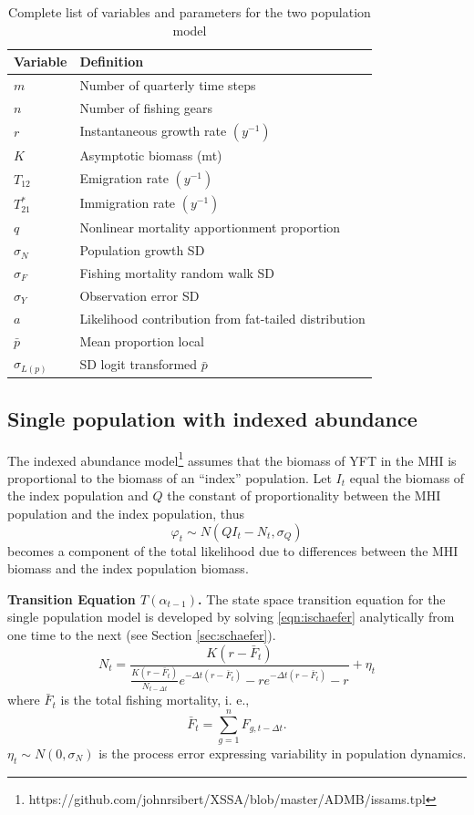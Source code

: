 \documentclass[12pt,letterpaper,twoside]{article}
\begin{document}
\begin{table}
\caption{Complete list of variables and parameters for the two
population model
\label{tab:allvars2}}
\begin{center}
\begin{tabular}{ll}
\hline
Variable & Definition\\
\hline
\hline
$m$ & Number of quarterly time steps\\
$n$ & Number of fishing gears\\
\hline
\hline
$r$ & Instantaneous growth rate $(y^{-1})$\\
$K$ & Asymptotic biomass (mt) \\
$T_{12}$ & Emigration rate $(y^{-1})$\\
$T^*_{21}$& Immigration rate $(y^{-1})$\\
$q$ & Nonlinear mortality apportionment proportion\\
\hline
$\sigma_N$ & Population growth SD\\
$\sigma_F$ & Fishing mortality random walk SD\\
$\sigma_Y$ & Observation error SD \\
$a$ & Likelihood contribution from fat-tailed distribution\\
\hline
$\bar{p}$ & Mean proportion local\\
$\sigma_{L(p)}$ & SD logit transformed $\bar{p}$\\
\hline
\end{tabular}
\end{center}
\end{table}

\clearpage
\subsection{Single population with indexed abundance}
The indexed abundance model\footnote{https://github.com/johnrsibert/XSSA/blob/master/ADMB/issams.tpl}
assumes that the biomass of YFT in the MHI
is proportional to the biomass of an ``index'' population.
Let $I_t$ equal the biomass of the index population and $Q$ the
constant of proportionality between the MHI population and the index
population, thus
\begin{equation}
\label{eqn:Qprop}
\varphi_t \sim N(QI_t-N_t,\sigma_Q)
\end{equation}
becomes a component of the total likelihood due to differences between
the MHI biomass and the index population biomass.


{\bf Transition Equation $T(\alpha_{t-1})$.}
The state space transition equation for the single population model is
developed by solving \ref{eqn:ischaefer} analytically from one time to
the next (see Section \ref{sec:schaefer}).
\begin{equation}
N_t = \frac{K(r-\bar{F}_t)}{\frac{K(r-\bar{F}_t)}{N_{t-\Delta t}}e^{-\Delta
t(r-\bar{F}_t)}-re^{-\Delta t(r-\bar{F}_t)} -r} + \eta_t
\end{equation}
where 
$\bar{F}_t$ is the total fishing mortality, i. e.,
$$
\bar{F}_t =\sum_{g=1}^n F_{g,t-\Delta t}.
$$
$\eta_t \sim N(0,\sigma_N)$ is the process error expressing
variability in population dynamics.
\end{document}
